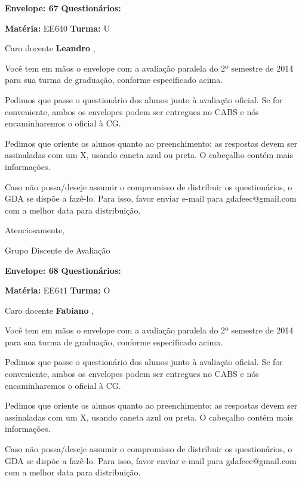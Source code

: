 \documentclass[a5paper]{letter}
\begin{document}
\vspace{0.5cm}

{\bf Envelope: 67 }		\hfill	{\bf Questionários:} \hspace{2cm}

\newpage
\thispagestyle{empty}

\hfill {\bf Matéria:} EE640 {\bf Turma:} U

Caro docente {\bf Leandro }, 

	Você tem em mãos o envelope com a avaliação paralela do 2º semestre de 2014 para sua turma de graduação, conforme especificado acima.

	Pedimos que passe o questionário dos alunos junto à avaliação oficial. Se for conveniente, ambos os envelopes podem ser entregues no CABS e nós encaminharemos o oficial à CG.

Pedimos que oriente os alunos quanto ao preenchimento: as respostas devem ser assinaladas com um X, usando caneta azul ou preta. O cabeçalho contém mais informações.

	Caso não possa/deseje assumir o compromisso de distribuir os questionários, o GDA se dispõe a fazê-lo. Para isso, favor enviar e-mail para gdafeec@gmail.com com a melhor data para distribuição.


Atenciosamente, 

Grupo Discente de Avaliação

\vspace{0.5cm}

{\bf Envelope: 68 }		\hfill	{\bf Questionários:} \hspace{2cm}

\newpage
\thispagestyle{empty}

\hfill {\bf Matéria:} EE641 {\bf Turma:} O

Caro docente {\bf Fabiano }, 

	Você tem em mãos o envelope com a avaliação paralela do 2º semestre de 2014 para sua turma de graduação, conforme especificado acima.

	Pedimos que passe o questionário dos alunos junto à avaliação oficial. Se for conveniente, ambos os envelopes podem ser entregues no CABS e nós encaminharemos o oficial à CG.

Pedimos que oriente os alunos quanto ao preenchimento: as respostas devem ser assinaladas com um X, usando caneta azul ou preta. O cabeçalho contém mais informações.

	Caso não possa/deseje assumir o compromisso de distribuir os questionários, o GDA se dispõe a fazê-lo. Para isso, favor enviar e-mail para gdafeec@gmail.com com a melhor data para distribuição.
\end{document}
